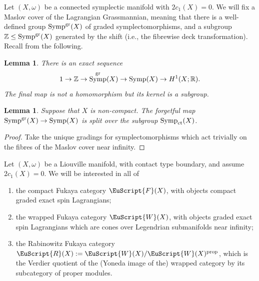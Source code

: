 \documentclass[10pt,a4paper]{amsart}
\def\scrR{\EuScript{R}}
\newcommand{\scrF}{\EuScript{F}}
\def\scrW{\EuScript{W}}
\DeclareMathOperator{\Symp}{Symp}
\def\bZ{\mathbb{Z}}
\def\bR{\mathbb{R}}
\newtheorem{lem}[thm]{Lemma}
\theoremstyle{definition}
\numberwithin{equation}{section}
\begin{document}
Let $(X,\omega)$ be a connected symplectic manifold with $2c_1(X)=0$. We will fix a Maslov cover of the Lagrangian Grassmannian, meaning that there is a well-defined group $\Symp^{\rm gr}(X)$ of graded symplectomorphisms, and a subgroup $\bZ \leq \Symp^{\rm gr}(X)$ generated by the shift (i.e., the fibrewise deck transformation). Recall from \cite[Lemma~2.4]{Seidel:graded} the following.

\begin{lem}
There is an exact sequence
\[
1 \to \bZ \to \Symp^{\rm gr}(X) \to \Symp(X) \to H^1(X;\bR).
\]
The final map is not a homomorphism but its kernel is a subgroup.
\end{lem}

\begin{lem}\label{lem:forgetting-gradings-splits}
Suppose that $X$ is non-compact. The forgetful map $\Symp^{\rm gr}(X) \to \Symp(X)$ is split over the subgroup $\Symp_{\rm ct}(X)$.
\end{lem}

\begin{proof} Take the unique gradings for symplectomorphisms which act trivially on the fibres of the Maslov cover near infinity.
\end{proof}

Let $(X,\omega)$ be a Liouville manifold, with contact type boundary, and assume $2c_1(X)=0$. We will be interested in all of
\begin{enumerate}\itemsep=0pt
\item[(1)] the compact Fukaya category $\scrF(X)$, with objects compact graded exact spin Lagrangians;
\item[(2)] the wrapped Fukaya category $\scrW(X)$, with objects graded exact spin Lagrangians which are cones over Legendrian submanifolds near infinity;
\item[(3)] the Rabinowitz Fukaya category $\scrR(X) := \scrW(X) / \scrW(X)^{\rm prop}$, which is the Verdier quotient of the (Yoneda image of the) wrapped category by its subcategory of proper modules.
\end{enumerate}
\end{document}
